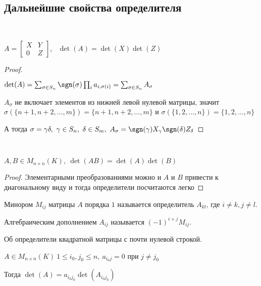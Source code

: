 \subsection{Дальнейшие свойства определителя}

\begin{prop}~

    $A = \begin{bmatrix}
        X & Y \\
        0 & Z
    \end{bmatrix}$,~ $\det(A) = \det(X) \det(Z)$
\end{prop}

\begin{proof}~

    $\det(A) = \sum_{\sigma \in S_n} \sgn(\sigma) \prod_i a_{i, \sigma(i)} = \sum_{\sigma \in S_n} A_{\sigma}$
    
    $A_{\sigma} $ не включает элементов из нижней левой нулевой матрицы, значит $\sigma(\{n + 1, n + 2, \ldots, m\}) = \{n + 1, n + 2, \ldots, m\}$ и $\sigma(\{1, 2, \ldots, n\}) = \{1, 2, \ldots, n\}$

    А тогда $\sigma = \gamma \delta, ~ \gamma \in S_n, ~ \delta \in S_m, ~ A_{\sigma} = \sgn(\gamma) X_{\gamma} \sgn(\delta) Z_\delta$
\end{proof}

\begin{prop}~

    $A, B \in M_{n \times n}(K), ~ \det(AB) = \det(A) \det(B)$
\end{prop}

\begin{proof}
    Элементарными преобразованиями можно и $A$ и $B$ привести к диагональному виду и тогда определители посчитаются легко
\end{proof}

\begin{defn}
    Минором $M_{ij}$ матрицы $A$ порядка $1$ называется определитель $A_{kl}$, где $i \neq k, j \neq l$.

    Алгебраическим дополнением $A_{ij}$ называется $(-1)^{i + j} M_{ij}$.
\end{defn}

\begin{lemma}
    Об определители квадратной матрицы с почти нулевой строкой.

    $A \in M_{n \times n}(K) ~ 1 \le i_0, j_0 \le n, ~ a_{i_0j} = 0$ при $j \neq j_0$

    Тогда $\det(A) = a_{i_0j_0}\det(A_{i_0j_0})$
\end{lemma}

